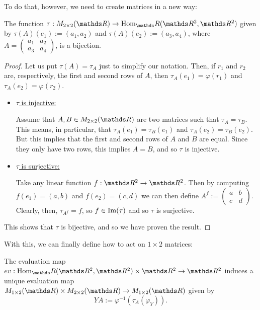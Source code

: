 To do that, however, we need to create matrices in a new way:

\begin{prop}
	The function $\tau: M_{2\times 2}(\R)\to\hom_\R(\R^2,\R^2)$ given by $\tau(A)(e_1):=(a_1,a_2)$ and $\tau(A)(e_2):=(a_3,a_4)$, where $A=\begin{pmatrix}
	a_1&a_2\\a_3&a_4
	\end{pmatrix}$, is a bijection.
\end{prop}
\begin{proof}
	Let us put $\tau(A)=\tau_A$ just to simplify our notation. Then, if $r_1$ and $r_2$ are, respectively, the first and second rows of $A$, then $\tau_A(e_1)=\varphi(r_1)$ and $\tau_A(e_2)=\varphi(r_2)$.
	
	
	
	\begin{itemize}
		\item \underline{$\tau$ is injective:}
		
		Assume that $A,B\in M_{2\times 2}(\R)$ are two matrices such that $\tau_A=\tau_B$. This means, in particular, that $\tau_A(e_1)=\tau_B(e_1)$ and $\tau_A(e_2)=\tau_B(e_2)$. But this implies that the first and second rows of $A$ and $B$ are equal. Since they only have two rows, this implies $A=B$, and so $\tau$ is injective.
		
		\item \underline{$\tau$ is surjective:}
		
		Take any linear function $f:\R^2\to \R^2$. Then by computing $f(e_1)=(a,b)$ and $f(e_2)=(c,d)$ we can then define $A^f:=\begin{pmatrix}
		a&b\\c&d
		\end{pmatrix}$. Clearly, then, $\tau_{A^f}=f$, so $f\in\operatorname{Im}(\tau)$ and so $\tau$ is surjective.
	\end{itemize}
	
	This shows that $\tau$ is bijective, and so we have proven the result.
\end{proof}

With this, we can finally define how to act on $1\times 2$ matrices:

\begin{df}
	The evaluation map $ev:\hom_\R(\R^2,\R^2)\times\R^2\to \R^2$ induces a unique evaluation map $M_{1\times 2}(\R)\times M_{2\times 2}(\R)\to M_{1\times 2}(\R)$ given by
	\[YA:=\varphi^{-1}(\tau_A(\varphi_Y)).\]
\end{df}

